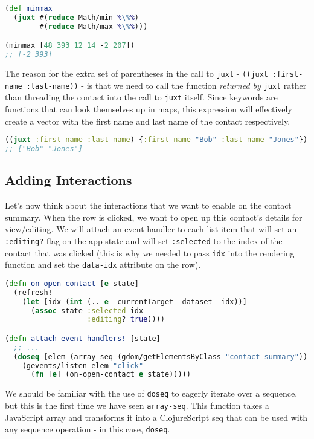 \documentclass[10pt,twoside,openright]{memoir}
\begin{document}
\begin{lstlisting}[language=Clojure]
(def minmax
  (juxt #(reduce Math/min %\%%)
        #(reduce Math/max %\%%)))

(minmax [48 393 12 14 -2 207])
;; [-2 393]
\end{lstlisting}

The reason for the extra set of parentheses in the call to \texttt{juxt}
- \texttt{((juxt\ :first-name\ :last-name))} - is that we need to call
the function \emph{returned by} \texttt{juxt} rather than threading the
contact into the call to \texttt{juxt} itself. Since keywords are
functions that can look themselves up in maps, this expression will
effectively create a vector with the first name and last name of the
contact respectively.

\begin{lstlisting}[language=Clojure]
((juxt :first-name :last-name) {:first-name "Bob" :last-name "Jones"})
;; ["Bob" "Jones"]
\end{lstlisting}

\subsection{Adding Interactions}

Let's now think about the interactions that we want to enable on the
contact summary. When the row is clicked, we want to open up this
contact's details for view/editing. We will attach an event handler to
each list item that will set an \texttt{:editing?} flag on the app state
and will set \texttt{:selected} to the index of the contact that was
clicked (this is why we needed to pass \texttt{idx} into the rendering
function and set the \texttt{data-idx} attribute on the row).

\begin{lstlisting}[language=Clojure]
(defn on-open-contact [e state]
  (refresh!
    (let [idx (int (.. e -currentTarget -dataset -idx))]
      (assoc state :selected idx
                   :editing? true))))

(defn attach-event-handlers! [state]
  ;; ...
  (doseq [elem (array-seq (gdom/getElementsByClass "contact-summary"))]
    (gevents/listen elem "click"
      (fn [e] (on-open-contact e state)))))
\end{lstlisting}

We should be familiar with the use of \texttt{doseq} to eagerly iterate over a sequence,
but this is the first time we have seen \texttt{array-seq}. This function takes a JavaScript
array and transforms it into a ClojureScript seq that can be used with any sequence
operation - in this case, \texttt{doseq}.
\end{document}
